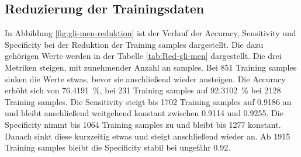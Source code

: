 \subsection{Reduzierung der Trainingsdaten}
In Abbildung \ref{fig:gli-men-reduktion} ist der Verlauf der Accuracy, Sensitivity und Specificity bei der Reduktion der Training samples dargestellt.
Die dazu gehörigen Werte werden in der Tabelle \ref{tab:Red-gli-men} dargestellt.
Die drei Metriken steigen, mit zunehmender Anzahl an samples. 
Bei 851 Training samples sinken die Werte etwas, bevor sie anschließend wieder ansteigen.
Die Accuracy erhöht sich von \SI{76.4191}{\percent}, bei 231 Training samples auf \SI{92.3102}{\percent} bei 2128 Training samples.
Die Sensitivity steigt bis 1702 Training samples auf \SI{0.9186}{} an und bleibt anschließend weitgehend konstant zwischen \SI{0.9114}{} und \SI{0.9255}{}.
Die Specificity nimmt bis 1064 Training samples zu und bleibt bis 1277 konstant. 
Danach sinkt diese kurzzeitig etwas und steigt anschließend wieder an. 
Ab 1915 Training samples bleibt die Specificity stabil bei ungefähr \SI{0.92}{}.
